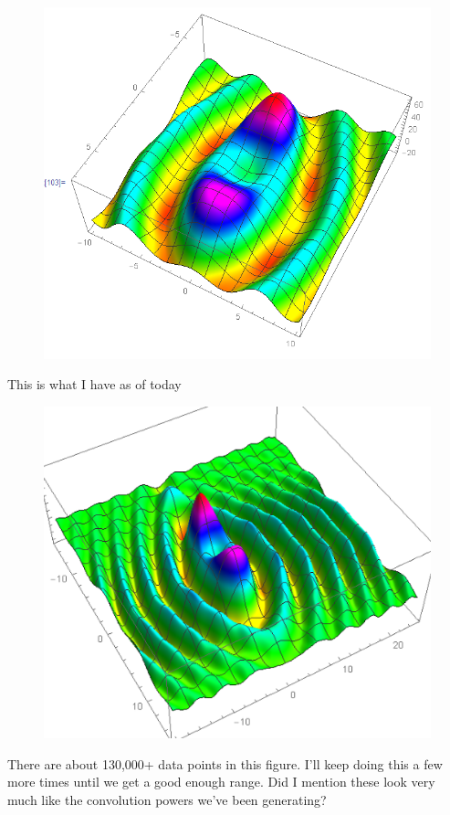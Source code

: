 \documentclass{article}
\theoremstyle{definition}
\begin{document}
\begin{figure}[!htb]
	\includegraphics[scale=0.3]{conv-8}
\end{figure}


This is what I have as of today
\begin{figure}[!htb]
	\centering
	\includegraphics[scale=0.5]{conv-9}
\end{figure}



There are about 130,000+ data points in this figure. I'll keep doing this a few more times until we get a good enough range. Did I mention these look very much like the convolution powers we've been generating?
\end{document}
